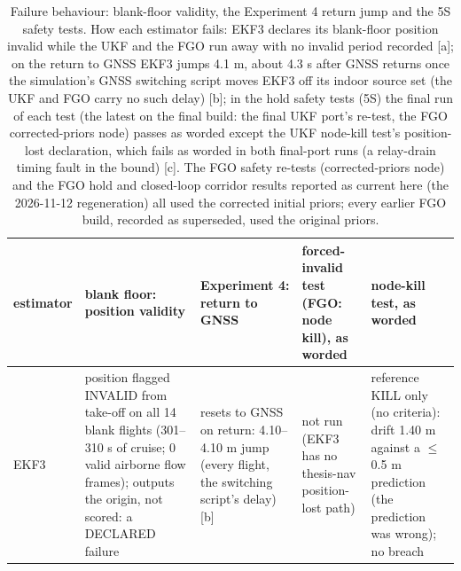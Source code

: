 \begin{table}[htbp]
\centering
\footnotesize
\caption{Failure behaviour: blank-floor validity, the Experiment 4 return jump and the 5S safety tests. How each estimator fails: EKF3 declares its blank-floor position invalid while the UKF and the FGO run away with no invalid period recorded [a]; on the return to GNSS EKF3 jumps 4.1 m, about 4.3 s after GNSS returns once the simulation's GNSS switching script moves EKF3 off its indoor source set (the UKF and FGO carry no such delay) [b]; in the hold safety tests (5S) the final run of each test (the latest on the final build: the final UKF port's re-test, the FGO corrected-priors node) passes as worded except the UKF node-kill test's position-lost declaration, which fails as worded in both final-port runs (a relay-drain timing fault in the bound) [c]. The FGO safety re-tests (corrected-priors node) and the FGO hold and closed-loop corridor results reported as current here (the 2026-11-12 regeneration) all used the corrected initial priors; every earlier FGO build, recorded as superseded, used the original priors.}
\label{tab:T7}
\begin{tabular}{p{}p{}p{}p{}p{}}
\toprule
\textbf{estimator} & \textbf{blank floor: position validity} & \textbf{Experiment 4: return to GNSS} & \textbf{forced-invalid test (FGO: node kill), as worded} & \textbf{node-kill test, as worded} \\
\midrule
EKF3 & position flagged INVALID from take-off on all 14 blank flights (301--310 s of cruise; 0 valid airborne flow frames); outputs the origin, not scored: a DECLARED failure & resets to GNSS on return: 4.10--4.10 m jump (every flight, the switching script's delay) [b] & not run (EKF3 has no thesis-nav position-lost path) & reference KILL only (no criteria): drift 1.40 m against a $\le$ 0.5 m prediction (the prediction was wrong); no breach \\

\end{tabular}
\end{table}
